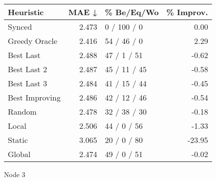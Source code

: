 \begin{tabular}{lrlr}
\toprule
\textbf{Heuristic} & \textbf{MAE ↓} & \textbf{\% Be/Eq/Wo} & \textbf{\% Improv.} \\
\midrule
            Synced &          2.473 &          0 / 100 / 0 &                0.00 \\
     Greedy Oracle &          2.416 &          54 / 46 / 0 &                2.29 \\
         Best Last &          2.488 &          47 / 1 / 51 &               -0.62 \\
       Best Last 2 &          2.487 &         45 / 11 / 45 &               -0.58 \\
       Best Last 3 &          2.484 &         41 / 15 / 44 &               -0.45 \\
    Best Improving &          2.486 &         42 / 12 / 46 &               -0.54 \\
            Random &          2.478 &         32 / 38 / 30 &               -0.18 \\
             Local &          2.506 &          44 / 0 / 56 &               -1.33 \\
            Static &          3.065 &          20 / 0 / 80 &              -23.95 \\
            Global &          2.474 &          49 / 0 / 51 &               -0.02 \\
\bottomrule
\end{tabular}
\caption{Node 3}
\label{tab:hr_iid_lr01_le2_bs2_3}

